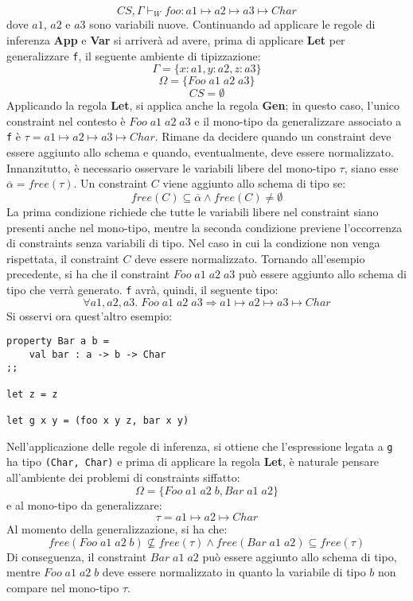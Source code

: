 \documentclass[10pt,a4paper]{article}
\begin{document}
\[ CS, \Gamma \vdash_W foo : a1 \mapsto a2 \mapsto a3 \mapsto Char \]
dove $ a1 $, $ a2 $ e $ a3 $ sono variabili nuove. Continuando ad applicare le regole di inferenza \textbf{App} e
\textbf{Var} si arriverà ad avere, prima di applicare \textbf{Let} per generalizzare \texttt{f}, il seguente
ambiente di tipizzazione:
\[ \Gamma = \{ x : a1, y : a2, z : a3 \} \]
\[ \Omega = \{ Foo \; a1 \; a2 \; a3 \} \]
\[ CS = \emptyset \]
Applicando la regola \textbf{Let}, si applica anche la regola \textbf{Gen}; in questo caso, l'unico constraint
nel contesto è $ Foo \; a1 \; a2 \; a3 $ e il mono-tipo da generalizzare associato a \texttt{f} è
$ \tau = a1 \mapsto a2 \mapsto a3 \mapsto Char $. Rimane da decidere quando un constraint deve essere aggiunto allo
schema e quando, eventualmente, deve essere normalizzato. Innanzitutto, è necessario osservare le variabili libere
del mono-tipo $ \tau $, siano esse $ \overline{\alpha} = free(\tau) $. Un constraint $ C $ viene aggiunto allo schema
di tipo se:
\[ free(C) \subseteq \overline{\alpha} \wedge free(C) \neq \emptyset \]
La prima condizione richiede che tutte le variabili libere nel constraint siano presenti anche nel mono-tipo, mentre
la seconda condizione previene l'occorrenza di constraints senza variabili di tipo. Nel caso in cui la condizione non
venga rispettata, il constraint $ C $ deve essere normalizzato. Tornando all'esempio precedente, si ha che
il constraint $ Foo \; a1 \; a2 \; a3 $ può essere aggiunto allo schema di tipo che verrà generato.
\texttt{f} avrà, quindi, il seguente tipo:
\[ \forall a1, a2, a3. \; Foo \; a1 \; a2 \; a3 \Rightarrow a1 \mapsto a2 \mapsto a3 \mapsto Char \]
Si osservi ora quest'altro esempio:
\begin{lstlisting}
property Bar a b =
    val bar : a -> b -> Char
;;

let z = z

let g x y = (foo x y z, bar x y)
\end{lstlisting}
Nell'applicazione delle regole di inferenza, si ottiene che l'espressione legata a \texttt{g} ha tipo
\texttt{(Char, Char)} e prima di applicare la regola \textbf{Let}, è naturale pensare all'ambiente dei problemi di
constraints siffatto:
\[ \Omega = \{ Foo \; a1 \; a2 \; b, Bar \; a1 \; a2 \} \]
e al mono-tipo da generalizzare:
\[ \tau = a1 \mapsto a2 \mapsto Char \]
Al momento della generalizzazione, si ha che:
\[ free(Foo \; a1 \; a2 \; b) \not\subseteq free(\tau) \wedge free(Bar \; a1 \; a2) \subseteq free(\tau) \]
Di conseguenza, il constraint $ Bar \; a1 \; a2 $ può essere aggiunto allo schema di tipo, mentre
$ Foo \; a1 \; a2 \; b $ deve essere normalizzato in quanto la variabile di tipo $ b $ non compare nel mono-tipo $ \tau $.
\end{document}
